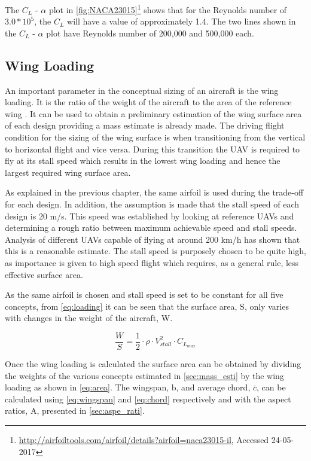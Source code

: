 The $C_{L}$ - $\alpha$ plot in \autoref{fig:NACA23015}\footnote{\url{http://airfoiltools.com/airfoil/details?airfoil=naca23015-il}, Accessed 24-05-2017} shows that for the Reynolds number of $3.0*10^{5}$, the $C_{L}$ will have a value of approximately 1.4. The two lines shown in the $C_{L}$ - $\alpha$ plot have Reynolds number of 200,000 and 500,000 each. 



\subsection{Wing Loading}
An important parameter in the conceptual sizing of an aircraft is the wing loading. It is the ratio of the weight of the aircraft to the area of the reference wing \cite{aircraft_design}. It can be used to obtain a preliminary estimation of the wing surface area of each design providing a mass estimate is already made.
The driving flight condition for the sizing of the wing surface is when transitioning from the vertical to horizontal flight and vice versa. During this transition the UAV is required to fly at its stall speed which results in the lowest wing loading and hence the largest required wing surface area.

As explained in the previous chapter, the same airfoil is used during the trade-off for each design. In addition, the assumption is made that the stall speed of each design is  20 m/s. This speed was established by looking at reference UAVs and determining a rough ratio between maximum achievable speed and stall speeds. Analysis of different UAVs capable of flying at around 200 km/h has shown that this is a reasonable estimate. The stall speed is purposely chosen to be quite high, as importance is given to high speed flight which requires, as a general rule, less effective surface area. 

As the same airfoil is chosen and stall speed is set to be constant for all five concepts, from \autoref{eq:loading} it can be seen that the surface area, S, only varies with changes in the weight of the aircraft, W.

\begin{equation}
    \frac{W}{S}=\frac{1}{2} \cdot \rho \cdot V_{stall}^{2} \cdot C_{L_{max}}
    \label{eq:loading}
\end{equation}

Once the wing loading is calculated the surface area can be obtained by dividing the weights of the various concepts estimated in \autoref{sec:mass_esti} by the wing loading as shown in \autoref{eq:area}. The wingspan, b, and average chord, $\bar{c}$, can be calculated using \autoref{eq:wingspan} and \autoref{eq:chord} respectively and with the aspect ratios, A, presented in \autoref{sec:aspe_rati}. 

